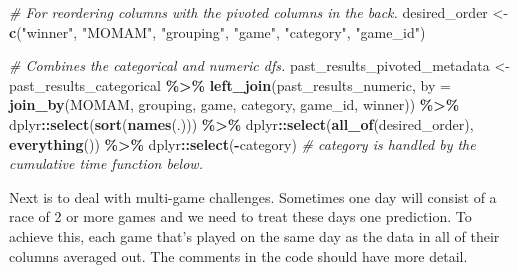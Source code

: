 \documentclass[
]{article}
\newenvironment{Shaded}{\begin{snugshade}}{\end{snugshade}}
\newcommand{\AttributeTok}[1]{\textcolor[rgb]{0.13,0.29,0.53}{#1}}
\newcommand{\CommentTok}[1]{\textcolor[rgb]{0.56,0.35,0.01}{\textit{#1}}}
\newcommand{\FunctionTok}[1]{\textcolor[rgb]{0.13,0.29,0.53}{\textbf{#1}}}
\newcommand{\NormalTok}[1]{#1}
\newcommand{\OtherTok}[1]{\textcolor[rgb]{0.56,0.35,0.01}{#1}}
\newcommand{\SpecialCharTok}[1]{\textcolor[rgb]{0.81,0.36,0.00}{\textbf{#1}}}
\newcommand{\StringTok}[1]{\textcolor[rgb]{0.31,0.60,0.02}{#1}}
\begin{document}
\begin{Shaded}
\begin{Highlighting}[]
\CommentTok{\# For reordering columns with the pivoted columns in the back.}
\NormalTok{desired\_order }\OtherTok{\textless{}{-}} \FunctionTok{c}\NormalTok{(}\StringTok{"winner"}\NormalTok{, }\StringTok{"MOMAM"}\NormalTok{, }\StringTok{"grouping"}\NormalTok{, }\StringTok{"game"}\NormalTok{, }\StringTok{"category"}\NormalTok{, }\StringTok{"game\_id"}\NormalTok{)}

\CommentTok{\# Combines the categorical and numeric dfs.}
\NormalTok{past\_results\_pivoted\_metadata }\OtherTok{\textless{}{-}}\NormalTok{ past\_results\_categorical }\SpecialCharTok{\%\textgreater{}\%}
  \FunctionTok{left\_join}\NormalTok{(past\_results\_numeric, }\AttributeTok{by =} \FunctionTok{join\_by}\NormalTok{(MOMAM, grouping, game, category, game\_id, winner)) }\SpecialCharTok{\%\textgreater{}\%}
\NormalTok{  dplyr}\SpecialCharTok{::}\FunctionTok{select}\NormalTok{(}\FunctionTok{sort}\NormalTok{(}\FunctionTok{names}\NormalTok{(.))) }\SpecialCharTok{\%\textgreater{}\%}
\NormalTok{  dplyr}\SpecialCharTok{::}\FunctionTok{select}\NormalTok{(}\FunctionTok{all\_of}\NormalTok{(desired\_order), }\FunctionTok{everything}\NormalTok{()) }\SpecialCharTok{\%\textgreater{}\%}
\NormalTok{  dplyr}\SpecialCharTok{::}\FunctionTok{select}\NormalTok{(}\SpecialCharTok{{-}}\NormalTok{category) }\CommentTok{\# category is handled by the cumulative time function below.}
\end{Highlighting}
\end{Shaded}

Next is to deal with multi-game challenges. Sometimes one day will
consist of a race of 2 or more games and we need to treat these days one
prediction. To achieve this, each game that's played on the same day as
the data in all of their columns averaged out. The comments in the code
should have more detail.
\end{document}
